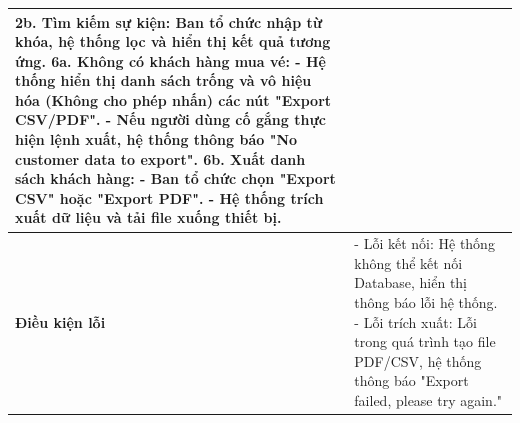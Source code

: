 \begin{longtable}{|p{}|p{}|}
2b. Tìm kiếm sự kiện: Ban tổ chức nhập từ khóa, hệ thống lọc và hiển thị kết quả tương ứng. \newline
6a. Không có khách hàng mua vé: \newline
\hspace*{1em}- Hệ thống hiển thị danh sách trống và vô hiệu hóa (Không cho phép nhấn) các nút "Export CSV/PDF". \newline
\hspace*{1em}- Nếu người dùng cố gắng thực hiện lệnh xuất, hệ thống thông báo "No customer data to export". \newline
\textbf{6b. Xuất danh sách khách hàng:} \newline
\hspace*{1em}- Ban tổ chức chọn "Export CSV" hoặc "Export PDF". \newline
\hspace*{1em}- Hệ thống trích xuất dữ liệu và tải file xuống thiết bị. \\ \hline
\textbf{Điều kiện lỗi} &
- Lỗi kết nối: Hệ thống không thể kết nối Database, hiển thị thông báo lỗi hệ thống. \newline
- Lỗi trích xuất: Lỗi trong quá trình tạo file PDF/CSV, hệ thống thông báo "Export failed, please try again." \\ \hline
\end{longtable}

